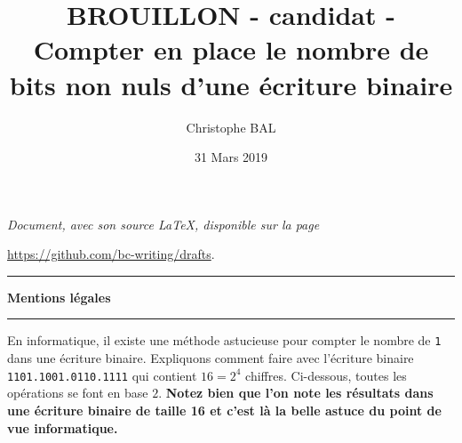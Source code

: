 \documentclass[12pt]{amsart}
\begin{document}
\title{BROUILLON - candidat - Compter en place le nombre de bits non nuls d'une écriture binaire}
\author{Christophe BAL}
\date{31 Mars 2019}

\maketitle

\begin{center}
	\itshape
	Document, avec son source \LaTeX, disponible sur la page
	
	\url{https://github.com/bc-writing/drafts}.
\end{center}


\bigskip


\begin{center}
	\hrule\vspace{.3em}
	{
		\fontsize{1.35em}{1em}\selectfont
		\textbf{Mentions \og légales \fg}
	}
			
	\vspace{0.45em}
	\doclicenseThis
	\hrule
\end{center}


\bigskip


En informatique, il existe une méthode astucieuse pour compter le nombre de \verb+1+ dans une écriture binaire.
Expliquons comment faire avec l'écriture binaire \verb+1101.1001.0110.1111+ qui contient $16 = 2^4$ chiffres. Ci-dessous, toutes les opérations se font en base $2$. 
\textbf{Notez bien que l'on note les résultats dans une écriture binaire  de taille 16 et c'est là la belle astuce du point de vue informatique.}
\end{document}

